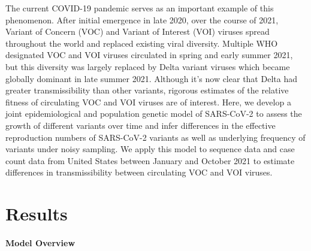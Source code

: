 \documentclass[11pt,oneside,letterpaper]{article}
\begin{document}
The current COVID-19 pandemic serves as an important example of this phenomenon.
After initial emergence in late 2020, over the course of 2021, Variant of Concern (VOC) and Variant of Interest (VOI) viruses spread throughout the world and replaced existing viral diversity.
Multiple WHO designated \cite{Konings2021} VOC and VOI viruses circulated in spring and early summer 2021, but this diversity was largely replaced by Delta variant viruses which became globally dominant in late summer 2021.
Although it's now clear that Delta had greater transmissibility than other variants, rigorous estimates of the relative fitness of circulating VOC and VOI viruses are of interest.
Here, we develop a joint epidemiological and population genetic model of SARS-CoV-2 to assess the growth of different variants over time and infer differences in the effective reproduction numbers of SARS-CoV-2 variants as well as underlying frequency of variants under noisy sampling.
We apply this model to sequence data and case count data from United States between January and October 2021 to estimate differences in transmissibility between circulating VOC and VOI viruses.

\section*{Results}

\paragraph{Model Overview}%
\end{document}
